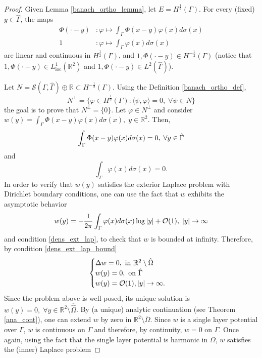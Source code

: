 \begin{proof}
    Given Lemma \ref{banach_ortho_lemma}, let \(E = H^\frac{1}{2}(\Gamma)\). For every (fixed) \(y \in \hat{\Gamma}\), the maps
    \begin{align*}
        \Phi(\cdot-y)&: \varphi \mapsto \int_\Gamma \Phi(x-y)\varphi(x) d\sigma(x)\\
        1&: \varphi \mapsto \int_\Gamma \varphi (x) d\sigma(x)
    \end{align*}
    are linear and continuous in \(H^\frac{1}{2}(\Gamma)\), and \(1, \Phi(\cdot-y) \in H^{-\frac{1}{2}}(\Gamma)\) (notice that \(1, \Phi(\cdot-y) \in L^1_{\text{loc}}(\mathbb{R}^2)\) and \(1, \Phi(\cdot-y) \in L^2(\hat{\Gamma})\)).
    
    Let \(N = \mathcal{S}(\Gamma, \hat{\Gamma}) \oplus \mathbb{R} \subset H^{-\frac{1}{2}}(\Gamma)\). Using the Definition \eqref{banach_ortho_def},
    \[
        N^\perp = \{\varphi \in H^{\frac{1}{2}}(\Gamma): \langle \psi, \varphi \rangle = 0, \; \forall \psi \in N\}
    \]
    the goal is to prove that \(N^\perp = \{0\}\). Let \(\varphi \in N^\perp\) and consider \(w(y) = \int_\Gamma\Phi(x-y)\varphi(x) d\sigma(x), \; y \in \mathbb{R}^2\). Then, 
    \begin{equation}\label{dens_ext_lap_bound}
        \int_\Gamma\Phi(x-y)\varphi(x) d\sigma(x) = 0, \; \forall y \in \hat{\Gamma}\\
    \end{equation}
    and
    \begin{equation}\label{dens_ext_lap}
        \int_\Gamma \varphi (x) d\sigma(x) = 0.
    \end{equation}
    In order to verify that \(w(y)\) satisfies the exterior Laplace problem with Dirichlet boundary conditions, one can use the fact that \(w\) exhibits the asymptotic behavior
    \[
        w(y) = -\frac{1}{2 \pi} \int_\Gamma \varphi (x) d\sigma(x) \log \abs{y} + \mathcal{O}(1), \; \abs{y} \rightarrow \infty
    \]
    and condition \eqref{dens_ext_lap}, to check that \(w\) is bounded at infinity. Therefore, by condition \eqref{dens_ext_lap_bound}
    \[
        \begin{cases}
            \Delta w = 0, \text{ in } \mathbb{R}^2\setminus \hat{\Omega}\\
            w(y) = 0, \text{ on } \hat{\Gamma}\\
            w(y) = \mathcal{O}(1), \abs{y} \rightarrow \infty.
        \end{cases}
    \]
    Since the problem above is well-posed, its unique solution is \(w(y) = 0, \; \forall y \in \mathbb{R}^2\setminus\overline{\hat{\Omega}}\). By (a unique) analytic continuation (see Theorem \ref{ana_cont}), one can extend \(w\) by zero in \(\mathbb{R}^2\setminus\overline{\Omega}\). Since \(w\) is a single layer potential over \(\Gamma\), \(w\) is continuous on \(\Gamma\) and therefore, by continuity, \(w = 0\) on \(\Gamma\). Once again, using the fact that the single layer potential is harmonic in \(\Omega\), \(w\) satisfies the (inner) Laplace problem

\end{proof}
